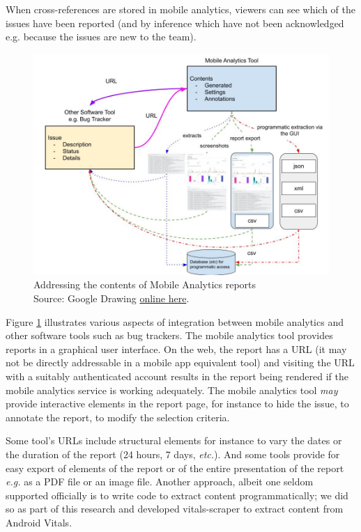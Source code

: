 When cross-references are stored in mobile analytics, viewers can see which of the issues have been reported (and by inference which have not been acknowledged e.g. because the issues are new to the team).

\begin{figure}
    \centering
    \includegraphics[width=\linewidth]{images/rough-sketches/integration-of-mobile-analytics-tool.jpeg}
    \caption[Addressing the contents of Mobile Analytics reports]{Addressing the contents of Mobile Analytics reports\\Source: Google Drawing \href{https://docs.google.com/drawings/d/1y7QP8UK7ugl0DzWIeH4udRxwsVMHjyQ6Am0qW6glkdE/edit?usp=sharing}{online here}.}
    \label{fig:addressing-the-contents-of-mobile-analytics}
\end{figure}

Figure \ref{fig:addressing-the-contents-of-mobile-analytics} illustrates various aspects of integration between mobile analytics and other software tools such as bug trackers. The mobile analytics tool provides reports in a graphical user interface. On the web, the report has a URL (it may not be directly addressable in a mobile app equivalent tool) and visiting the URL with a suitably authenticated account results in the report being rendered if the mobile analytics service is working adequately. The mobile analytics tool \emph{may} provide interactive elements in the report page, for instance to hide the issue, to annotate the report, to modify the selection criteria. 

Some tool's URLs include structural elements for instance to vary the dates or the duration of the report (24 hours, 7 days, \emph{etc.}). And some tools provide for easy export of elements of the report or of the entire presentation of the report \emph{e.g.} as a PDF file or an image file. Another approach, albeit one seldom supported officially is to write code to extract content programmatically; we did so as part of this research and developed vitals-scraper to extract content from Android Vitals.


